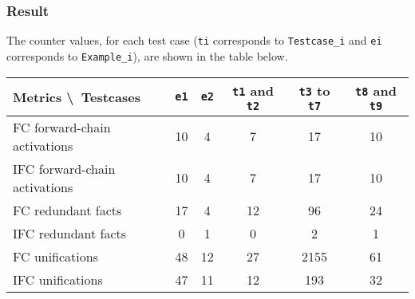 \documentclass[letterpaper]{article}
\begin{document}
\subsubsection{Result}
The counter values, for each test case (\texttt{ti} corresponds to \texttt{Testcase\_i} and \texttt{ei} corresponds to \texttt{Example\_i}), are shown in the table below.\bigbreak
\begin{tabular}{|l|c|c|c|c|c|}
\hline
Metrics \textbackslash\ Testcases & \texttt{e1} & \texttt{e2} & \texttt{t1} and \texttt{t2} & \texttt{t3} to \texttt{t7} & \texttt{t8} and \texttt{t9} \\ \hline\hline
FC forward-chain activations & 10 & 4 & 7 & 17 & 10 \\ \hline
IFC forward-chain activations & 10 & 4 & 7 & 17 & 10 \\ \hline\hline
FC redundant facts & 17 & 4 & 12 & 96 & 24 \\ \hline
IFC redundant facts & 0 & 1 & 0 & 2 & 1 \\ \hline\hline
FC unifications & 48 & 12 & 27 & 2155 & 61 \\ \hline
IFC unifications & 47 & 11 & 12 & 193 & 32 \\ \hline
\end{tabular}
\end{document}
